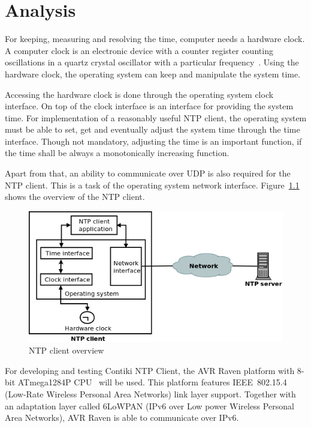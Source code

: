 
\chapter{Analysis}
For keeping, measuring and resolving the time, computer needs a hardware clock.
A computer clock is an electronic device with a counter register counting oscillations in a
quartz crystal oscillator with a particular frequency~\cite{thesis-sync}.
Using the hardware clock, the operating system can keep and manipulate the system time.

Accessing the hardware clock is done through the operating system clock interface.
On top of the clock interface is an interface for providing the system time.
For implementation of a reasonably useful NTP client,
the operating system must be able to set, get and eventually adjust the system time
through the time interface.
Though not mandatory, adjusting the time is an important function,
if the time shall be always a monotonically increasing function.

Apart from that, an ability to communicate over UDP is also required for the NTP client.
This is a task of the operating system network interface.
Figure~\ref{fig:analysis-overview} shows the overview of the NTP client.

\begin{figure}
  \centering
  \includegraphics[width=13cm,keepaspectratio]{fig/analysis.png}
  \caption{NTP client overview} %
  \label{fig:analysis-overview} %
\end{figure}

For developing and testing Contiki NTP Client,
the AVR Raven platform with 8-bit ATmega1284P CPU~\cite{avr-datasheet} will be used.
This platform features IEEE~802.15.4 (Low-Rate Wireless Personal Area Networks) link layer support.
Together with an adaptation layer called 6LoWPAN (IPv6 over Low power Wireless Personal Area Networks),
AVR Raven is able to communicate over IPv6.

